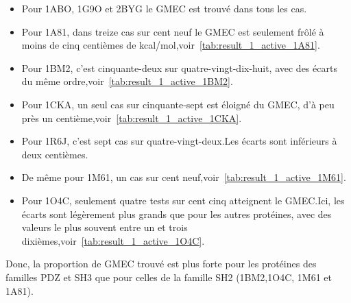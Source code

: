 \begin{itemize}
\item Pour 1ABO, 1G9O et 2BYG le GMEC est trouvé dans tous les cas.
\item Pour 1A81, dans treize cas sur cent neuf le GMEC est seulement frôlé à moins de cinq centièmes de kcal/mol,voir~\ref{tab:result_1_active_1A81}.
\item Pour 1BM2,  c'est cinquante-deux sur quatre-vingt-dix-huit, avec des écarts du même ordre,voir~\ref{tab:result_1_active_1BM2}.
\item Pour 1CKA, un seul cas sur cinquante-sept est éloigné du GMEC, d'à peu près un centième,voir~\ref{tab:result_1_active_1CKA}.
\item Pour 1R6J, c'est sept cas sur quatre-vingt-deux.Les écarts sont inférieurs à deux centièmes.
\item De même pour 1M61, un cas sur cent neuf,voir~\ref{tab:result_1_active_1M61}.
\item Pour 1O4C, seulement quatre tests sur cent cinq atteignent le GMEC.Ici, les écarts sont légèrement plus grands que pour les autres protéines, avec des valeurs le plus souvent entre un et trois dixièmes,voir~\ref{tab:result_1_active_1O4C}. 
\end{itemize}

Donc, la proportion de GMEC trouvé est plus forte  pour les protéines des familles PDZ et SH3 que pour celles de la famille SH2 (1BM2,1O4C, 1M61 et 1A81).

